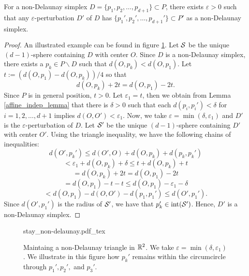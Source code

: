\documentclass[letterpaper,titlepage]{article}
\newcommand{\incfig}[1]{%
    {#1.pdf_tex}
}
\begin{document}

    \begin{lem}\label{stay-non-delaunay}
        For a non-Delaunay simplex $D= \{p_1,p_2,\dots,p_{d+1}\} \subset P$, there exists $\varepsilon>0$ such that any $\varepsilon$-perturbation $D'$ of $D$ has $\{p_1',p_2',\dots,p_{d+1}'\} \subset P'$ as a non-Delaunay simplex.
    \end{lem}
    \begin{proof}
        An illustrated example can be found in figure \ref{fig:stay_non-delaunay}. Let $\mathcal{S}$ be the unique $(d-1)$-sphere containing $D$ with center $O$. Since $D$ is a non-Delaunay simplex, there exists a $p_k \in P\backslash D$ such that $d(O,p_k) < d(O,p_1)$. Let $t:=(d(O,p_1)-d(O,p_k))/4$ so that 
        $$d(O,p_k)+2t = d(O,p_1)-2t.$$
        Since $P$ is in general position, $t > 0$. Let $\varepsilon_1 = t$, then we obtain from Lemma \ref{affine_indep_lemma} that there is $\delta>0$ such that each $d(p_i,p_i')<\delta$ for $i=1,2,\dots,d+1$ implies $d(O,O')<\varepsilon_1$. Now, we take $\varepsilon = \min(\delta, \varepsilon_1)$ and $D'$ is the $\varepsilon$-perturbation of $D$. Let $\mathcal{S}'$ be the unique $(d-1)$-sphere containing $D'$ with center $O'$. Using the triangle inequality, we have the following chains of inequalities:
        $$d(O',p_k') \leq d(O',O)+d(O,p_k)+d(p_k,p_k') $$
        $$< \varepsilon_1 + d(O,p_k)+\delta \leq t+d(O,p_k)+t$$
        $$=d(O,p_k)+2t= d(O,p_1)-2t$$
        $$=d(O,p_1)-t-t \leq d(O,p_1)-\varepsilon_1-\delta$$
        $$< d(O,p_1)-d(O,O')-d(p_1,p_1') \leq d(O',p_1').$$
        Since $d(O',p_1')$ is the radius of $\mathcal{S}'$, we have that $p_k' \in \text{int}(\mathcal{S}')$. Hence, $D'$ is a non-Delaunay simplex.
    \end{proof}
    
    \begin{figure}[ht!]
        \centering
        \fontsize{8pt}{9.8pt}\selectfont
        \def\svgwidth{\textwidth}
        \incfig{stay_non-delaunay}
        \caption{Maintaing a non-Delaunay triangle in $\mathbb{R}^2$. We take $\varepsilon = \min(\delta,\varepsilon_1)$. We illustrate in this figure how $p_k'$ remains within the circumcircle through $p_1', p_2',$ and $p_3'$.}
        \label{fig:stay_non-delaunay}
    \end{figure}
\end{document}

